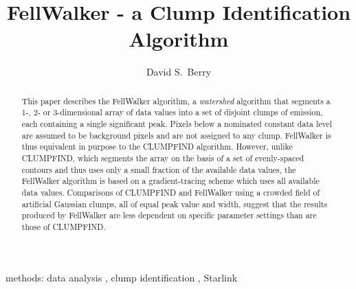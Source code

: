 \documentclass[final,authoryear,5p,times,twocolumn]{elsarticle}
\begin{document}
\begin{frontmatter}



\title{FellWalker - a Clump Identification Algorithm }


\author[jac]{David S.\ Berry}


\address[jac]{Joint Astronomy Centre, 660 N.\ A`oh\=ok\=u Place, Hilo, HI
  96720, USA}

\begin{abstract}
This paper describes the FellWalker algorithm, a \emph{watershed}
algorithm that segments a 1-, 2- or 3-dimensional array of data values
into a set of disjoint clumps of emission, each containing a single
significant peak. Pixels below a nominated constant data level are
assumed to be background pixels and are not assigned to any clump.
FellWalker is thus equivalent in purpose to the CLUMPFIND algorithm.
However, unlike CLUMPFIND, which segments the array on the basis of a set
of evenly-spaced contours and thus uses only a small fraction of the
available data values, the FellWalker algorithm is based on a
gradient-tracing scheme which uses all available data values. Comparisons
of CLUMPFIND and FellWalker using a crowded field of artificial Gaussian
clumps, all of equal peak value and width, suggest that the results
produced by FellWalker are less dependent on specific parameter settings
than are those of CLUMPFIND.
\end{abstract}

\begin{keyword}

methods: data analysis \sep
clump identification \sep
Starlink

\end{keyword}

\end{frontmatter}
\end{document}
